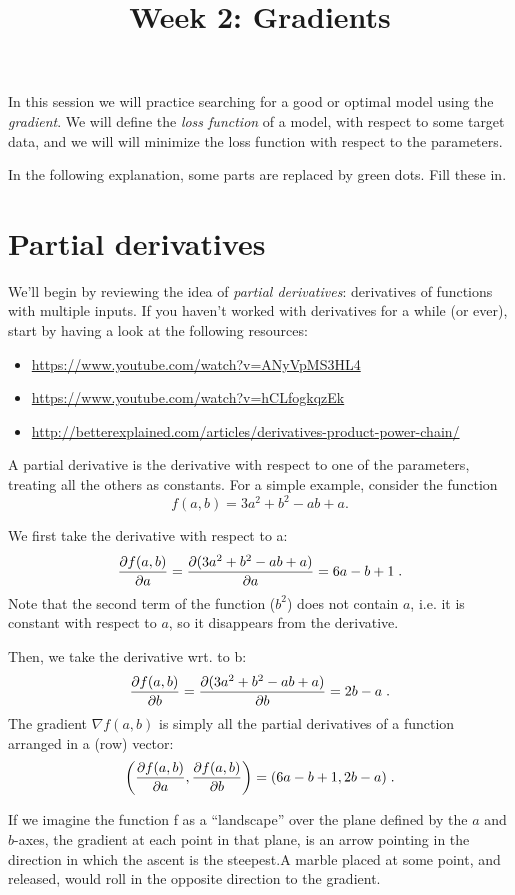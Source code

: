 \documentclass[11pt]{article}
\title{Week 2: Gradients}
\begin{document}
\maketitle

In this session we will practice searching for a good or optimal model using the \emph{gradient}. We will define the \emph{loss function} of a model, with respect to some target data, and we will will minimize the loss function with respect to the parameters.

In the following explanation, some parts are replaced by green dots. Fill these in.

\section{Partial derivatives}

We'll begin by reviewing the idea of \emph{partial derivatives}: derivatives of functions with multiple inputs. If you haven’t worked with derivatives for a while (or ever), start by having a look at the following resources:
\begin{itemize}
\item \url{https://www.youtube.com/watch?v=ANyVpMS3HL4}
\item \url{https://www.youtube.com/watch?v=hCLfogkqzEk}
\item \url{http://betterexplained.com/articles/derivatives-product-power-chain/}
\end{itemize}

A partial derivative is the derivative with respect to one of the parameters, treating all the others as constants. For a simple example, consider the function
\[
 f(a,b)= 3a^2 + b^2 - ab + a.
\]

We first take the derivative with respect to a:
\[
	\frac{\partial f(a,b)}{\partial a} = \frac{\partial(3a^2 + b^2 - ab + a)}{\partial a} = 6a -b + 1 \;\text{.}
\]
Note that the second term of the function ($b^2$) does not contain $a$, i.e. it is constant with respect to $a$, so it disappears from the derivative.

Then, we take the derivative wrt. to b:
\[
\frac{\partial f(a,b)}{\partial b} = \frac{\partial(3a^2 + b^2 - ab + a)}{\partial b} = 2b - a \;\text{.}
\]
The gradient $\nabla f(a,b)$ is simply all the partial derivatives of a function arranged in a (row) vector:
\[
 \left ( \frac{\partial f(a,b)}{\partial a}, \frac{\partial f(a,b)}{\partial b}\right) = (6a - b + 1, 2b - a) \;\text{.}
\]

\noindent If we imagine the function f as a ``landscape'' over the plane defined by the $a$ and $b$-axes, the gradient at each point in that plane, is an arrow pointing in the direction in which the ascent is the steepest.\footnotemark A marble placed at some point, and released, would roll in the opposite direction to the gradient.
\end{document}
